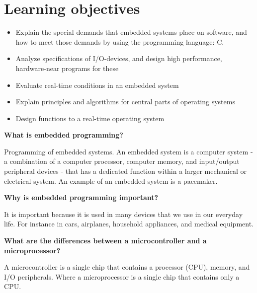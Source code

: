 \section{Learning objectives}


\begin{itemize}
	\item {Explain the special demands that embedded systems place on software, and how to meet
	      those demands by using the programming language: C.}
	      \item{Analyze specifications of I/O-devices, and design high performance, hardware-near programs for these}
	\item Evaluate real-time conditions in an embedded system
	\item Explain principles and algorithms for central parts of operating systems
	\item Design functions to a real-time operating system
\end{itemize}


\textbf{What is embedded programming?}

Programming of embedded systems. An embedded system is a computer system -
a combination of a computer processor, computer memory, and input/output peripheral devices -
that has a dedicated function within a larger mechanical or electrical system.
An example of an embedded system is a pacemaker.


\textbf{Why is embedded programming important?}

It is important because it is used in many devices that we use in our everyday life.
For instance in cars, airplanes, household appliances, and medical equipment.


\textbf{What are the differences between a microcontroller and a microprocessor?}

A microcontroller is a single chip that contains a processor (CPU), memory, and I/O peripherals.
Where a microprocessor is a single chip that contains only a CPU.

